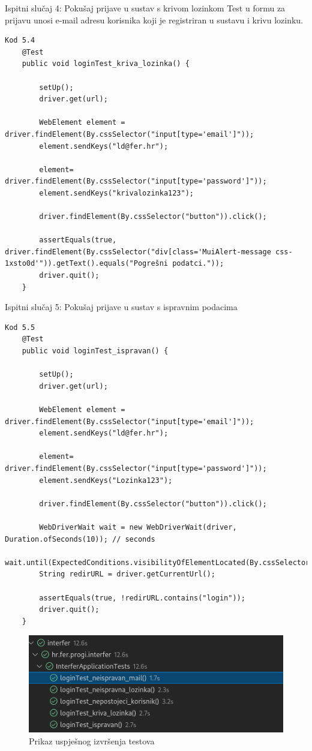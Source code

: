 Ispitni slučaj 4: Pokušaj prijave u sustav s krivom lozinkom
Test u formu za prijavu unosi e-mail adresu korisnika koji je registriran u sustavu i krivu lozinku.
\begin{verbatim}Kod 5.4
	@Test
	public void loginTest_kriva_lozinka() {

		setUp();
		driver.get(url);

		WebElement element = driver.findElement(By.cssSelector("input[type='email']")); 
		element.sendKeys("ld@fer.hr");

		element= driver.findElement(By.cssSelector("input[type='password']")); 
		element.sendKeys("krivalozinka123");

		driver.findElement(By.cssSelector("button")).click();

		assertEquals(true, driver.findElement(By.cssSelector("div[class='MuiAlert-message css-1xsto0d'")).getText().equals("Pogrešni podatci."));
		driver.quit();
	}
\end{verbatim}

Ispitni slučaj 5: Pokušaj prijave u sustav s ispravnim podacima
\begin{verbatim}Kod 5.5
	@Test
	public void loginTest_ispravan() {

		setUp();
		driver.get(url);

		WebElement element = driver.findElement(By.cssSelector("input[type='email']")); 
		element.sendKeys("ld@fer.hr");

		element= driver.findElement(By.cssSelector("input[type='password']")); 
		element.sendKeys("Lozinka123");

		driver.findElement(By.cssSelector("button")).click();
		
		WebDriverWait wait = new WebDriverWait(driver, Duration.ofSeconds(10)); // seconds
		wait.until(ExpectedConditions.visibilityOfElementLocated(By.cssSelector("svg")));
		String redirURL = driver.getCurrentUrl();
   
		assertEquals(true, !redirURL.contains("login"));
		driver.quit();
	}
\end{verbatim}

\begin{figure}[H]
	\includegraphics[scale=0.6]{slike/test_prolaz.png}
	\centering
	\caption{Prikaz uspješnog izvršenja testova}
\end{figure}

